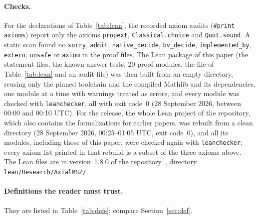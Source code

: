 \documentclass[11pt]{article}
\theoremstyle{definition}
\theoremstyle{remark}
\newcommand{\repoversion}{1.8.0}
\begin{document}
\paragraph{Checks.}
For the declarations of Table~\ref{tab:lean}, the recorded axiom audits
(\texttt{\#print axioms}) report only the axioms \texttt{propext},
\texttt{Classical.choice} and \texttt{Quot.sound}. A static scan found no \texttt{sorry},
\texttt{admit}, \texttt{native\_decide}, \texttt{bv\_decide},
\texttt{implemented\_by}, \texttt{extern}, \texttt{unsafe} or
\texttt{axiom} in the proof files. The Lean package of this paper (the
statement files, the known-answer tests, 20 proof modules, the file of
Table~\ref{tab:lean} and an audit file) was then built from an empty
directory, reusing only the pinned toolchain and the compiled Mathlib and its
dependencies, one module at a time with
warnings treated as errors, and every module was checked with
\texttt{leanchecker}, all with exit code~$0$ (28 September 2026, between
00:00 and 00:10 UTC). For the release, the whole Lean
project of the repository, which also contains the formalizations for
earlier papers, was rebuilt from a clean directory (28 September 2026,
00:25--01:05 UTC, exit code~$0$), and all its modules, including those of
this paper, were checked again with \texttt{leanchecker}; every axiom list
printed in that rebuild is a subset of the three axioms above.
The Lean files are in version~\repoversion{} of the
repository~\cite{repo}, directory \texttt{lean/Research/AxialMSZ/}.

\paragraph{Definitions the reader must trust.}
They are listed in Table~\ref{tab:defs}; compare Section~\ref{sec:def}.
\end{document}
